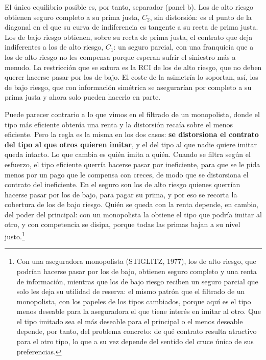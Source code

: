 \documentclass[10pt,a4paper]{article}
\begin{document}
El único equilibrio posible es, por tanto, separador (panel b). Los de alto riesgo obtienen seguro completo a su prima justa, $C_2$, sin distorsión: es el punto de la diagonal en el que su curva de indiferencia es tangente a su recta de prima justa. Los de bajo riesgo obtienen, sobre su recta de prima justa, el contrato que deja indiferentes a los de alto riesgo, $C_1$: un seguro parcial, con una franquicia que a los de alto riesgo no les compensa porque esperan sufrir el siniestro más a menudo. La restricción que se satura es la RCI de los de alto riesgo, que no deben querer hacerse pasar por los de bajo. El coste de la asimetría lo soportan, así, los de bajo riesgo, que con información simétrica se asegurarían por completo a su prima justa y ahora solo pueden hacerlo en parte.

Puede parecer contrario a lo que vimos en el filtrado de un monopolista, donde el tipo más eficiente obtenía una renta y la distorsión recaía sobre el menos eficiente. Pero la regla es la misma en los dos casos: \textbf{se distorsiona el contrato del tipo al que otros quieren imitar}, y el del tipo al que nadie quiere imitar queda intacto. Lo que cambia es quién imita a quién. Cuando se filtra según el esfuerzo, el tipo eficiente querría hacerse pasar por ineficiente, para que se le pida menos por un pago que le compensa con creces, de modo que se distorsiona el contrato del ineficiente. En el seguro son los de alto riesgo quienes querrían hacerse pasar por los de bajo, para pagar su prima, y por eso se recorta la cobertura de los de bajo riesgo. Quién se queda con la renta depende, en cambio, del poder del principal: con un monopolista la obtiene el tipo que podría imitar al otro, y con competencia se disipa, porque todas las primas bajan a su nivel justo.\footnote{%
    Con una aseguradora monopolista (STIGLITZ, 1977), los de alto riesgo, que podrían hacerse pasar por los de bajo, obtienen seguro completo y una renta de información, mientras que los de bajo riesgo reciben un seguro parcial que solo les deja su utilidad de reserva: el mismo patrón que el filtrado de un monopolista, con los papeles de los tipos cambiados, porque aquí es el tipo menos deseable para la aseguradora el que tiene interés en imitar al otro. Que el tipo imitado sea el más deseable para el principal o el menos deseable depende, por tanto, del problema concreto: de qué contrato resulta atractivo para el otro tipo, lo que a su vez depende del sentido del cruce único de sus preferencias.
}
\end{document}
